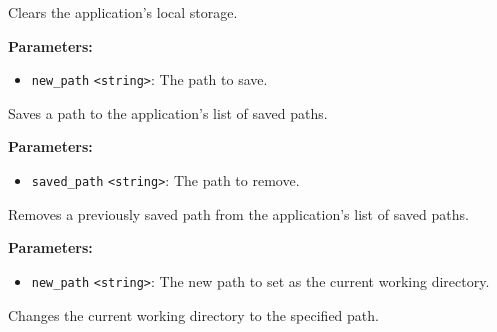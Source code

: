 \documentclass[12pt,a4paper]{article}
\begin{document}
\vspace{5mm}
\noindent {}


\noindent Clears the application's local storage.

\vspace{5mm}
\noindent {}


\noindent \textbf{Parameters:}
\begin{itemize}
  \item \texttt{new\_path} \texttt{<string>}: The path to save.
\end{itemize}

\noindent Saves a path to the application's list of saved paths.

\vspace{5mm}
\noindent {}


\noindent \textbf{Parameters:}
\begin{itemize}
  \item \texttt{saved\_path} \texttt{<string>}: The path to remove.
\end{itemize}

\noindent Removes a previously saved path from the application's list of saved paths.

\vspace{5mm}
\noindent {}


\noindent \textbf{Parameters:}
\begin{itemize}
  \item \texttt{new\_path} \texttt{<string>}: The new path to set as the current working directory.
\end{itemize}

\noindent Changes the current working directory to the specified path.

\vspace{5mm}
\noindent {}
\end{document}
